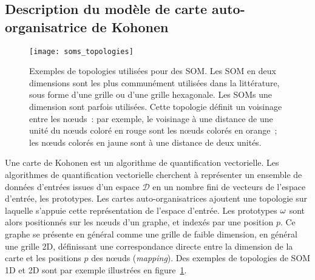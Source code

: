 \documentclass[../main]{subfiles}
\begin{document}
\subsection{Description du modèle de carte auto-organisatrice de Kohonen}\label{sec:modele_som}

\begin{figure}
    \centering
    \texttt{[image: soms\_topologies]}
    \caption{Exemples de topologies utilisées pour des SOM. Les SOM en deux dimensions sont les plus communément utilisées dans la littérature, sous forme d'une grille ou d'une grille hexagonale. Les SOMs une dimension sont parfois utilisées. Cette topologie définit un voisinage entre les n\oe{}uds~: par exemple, le voisinage à une distance de une unité du n\oe{}uds coloré en rouge sont les n\oe{}uds colorés en orange~; les n\oe{}uds colorés en jaune sont à une distance de deux unités.
    \label{fig:topo}}
    \end{figure}





Une carte de Kohonen est un algorithme de quantification vectorielle. 
Les algorithmes de quantification vectorielle cherchent à représenter un ensemble de données d'entrées issues d'un espace $\mathcal{D}$ en un nombre fini de vecteurs de l'espace d'entrée, les prototypes.
Les cartes auto-organisatrices ajoutent une topologie sur laquelle s'appuie cette représentation de l'espace d'entrée. Les prototypes $\omega$ sont alors positionnés sur les n\oe{}uds d'un graphe, et indexés par une position $p$. 
Ce graphe se présente en général comme une grille de faible dimension, en général une grille 2D, définissant une correspondance directe entre la dimension de la carte et les positions $p$ des n\oe{}uds
(\emph{mapping}). Des exemples de topologies de SOM 1D et 2D sont par exemple illustrées en figure~\ref{fig:topo}.
\end{document}
